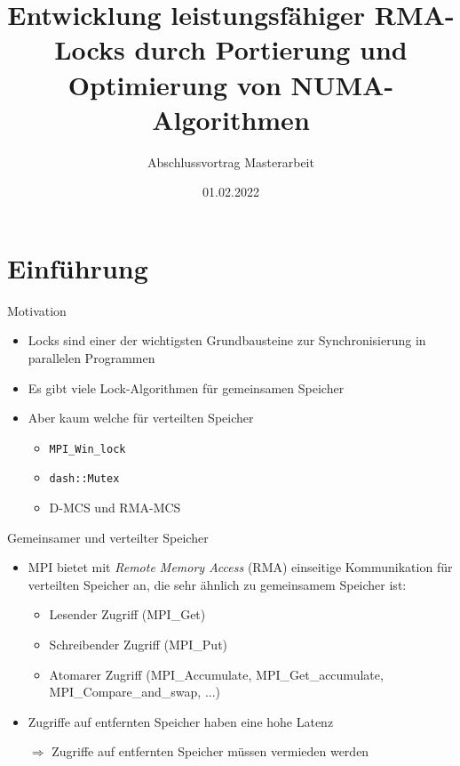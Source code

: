 \documentclass[fleqn,compress,utf8,aspectratio=169,t]{beamer}
\author[Uffmann]{
  \newauthor{Adrian Uffmann}{adrian.uffmann@campus.lmu.de}
}
\institute[LMU]{
  {LMU München}
}
\date[1.2.22]{01.02.2022}
\title{Entwicklung leistungsfähiger RMA-Locks durch Portierung und Optimierung von NUMA-Algorithmen}
\subtitle{Abschlussvortrag Masterarbeit}
\begin{document}
\begin{frame}
    \titlepage
\end{frame}

\section{Einführung}

\begin{frame}{Motivation}
    \begin{itemize}
        \item Locks sind einer der wichtigsten Grundbausteine zur Synchronisierung in parallelen Programmen
        \item Es gibt viele Lock-Algorithmen für gemeinsamen Speicher
        \item Aber kaum welche für verteilten Speicher
              \begin{itemize}
                  \item \texttt{MPI\_Win\_lock}
                  \item \texttt{dash::Mutex} \cite{DART-MPI}
                  \item D-MCS und RMA-MCS \cite{RMA-RW}
              \end{itemize}
    \end{itemize}
\end{frame}

\begin{frame}{Gemeinsamer und verteilter Speicher}
    \begin{itemize}
        \item MPI bietet mit \textit{Remote Memory Access} (RMA) einseitige Kommunikation für verteilten Speicher an, die sehr ähnlich zu gemeinsamem Speicher ist:
              \begin{itemize}
                  \item Lesender Zugriff (MPI\_Get)
                  \item Schreibender Zugriff (MPI\_Put)
                  \item Atomarer Zugriff (MPI\_Accumulate, MPI\_Get\_accumulate, MPI\_Compare\_and\_swap, ...)
              \end{itemize}\pause
        \item Zugriffe auf entfernten Speicher haben eine hohe Latenz
        \item[$\Rightarrow$] Zugriffe auf entfernten Speicher müssen vermieden werden
    \end{itemize}
\end{frame}
\end{document}
